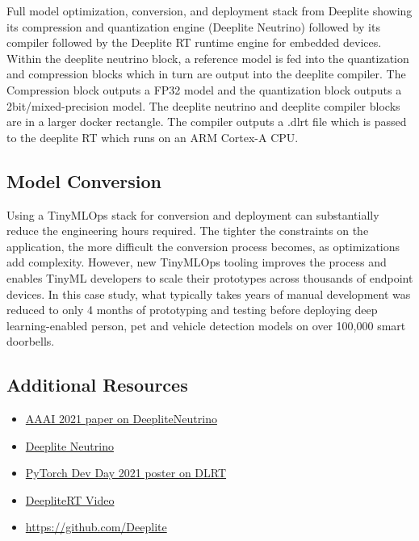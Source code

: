 {{{{{     

    Full model optimization, conversion, and deployment stack from Deeplite showing its compression and quantization engine (Deeplite Neutrino) followed by its compiler followed by the Deeplite RT runtime engine for embedded devices. Within the deeplite neutrino block, a reference model is fed into the quantization and compression blocks which in turn are output into the deeplite compiler. The Compression block outputs a FP32 model and the quantization block outputs a 2bit/mixed-precision model. The deeplite neutrino and deeplite compiler blocks are in a larger docker rectangle. The compiler outputs a .dlrt file which is passed to the deeplite RT which runs on an ARM Cortex-A CPU.
    
    \subsection{Model Conversion}
    
    Using a TinyMLOps stack for conversion and deployment can substantially reduce the engineering hours required. The tighter the constraints on the application, the more difficult the conversion process becomes, as optimizations add complexity. However, new TinyMLOps tooling improves the process and enables TinyML developers to scale their prototypes across thousands of endpoint devices. In this case study, what typically takes years of manual development was reduced to only 4 months of prototyping and testing before deploying deep learning-enabled person, pet and vehicle detection models on over 100,000 smart doorbells.
    
    \subsection{Additional Resources}
    
    \begin{itemize}
      \item \href{https://arxiv.org/abs/2101.04073}{AAAI 2021 paper on DeepliteNeutrino}
      \item \href{https://docs.deeplite.ai/neutrino/index.html}{Deeplite Neutrino}
      \item \href{https://info.deeplite.ai/deeplite-pytorch-developer-day-poster?utm_source=hs_email&utm_medium=email&_hsenc=p2ANqtz-9LTa1hhXuEMLXVs5VZjE6ntg_AYQhGyazAqnYYNE3BT9jikvgvBi-FyU_JvHLJYToC7kQJ}{PyTorch Dev Day 2021 poster on DLRT}
      \item \href{https://www.youtube.com/watch?v=0bJs7dHC8o4}{DeepliteRT Video}
      \item \href{https://github.com/Deeplite}{https://github.com/Deeplite}
    \end{itemize}

}}}}}
